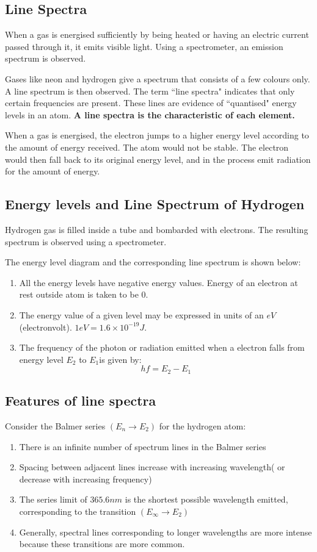 \subsection{Line Spectra}
When a gas is energised sufficiently by being heated or having an electric current passed through it, it emits visible light. Using a spectrometer, an emission spectrum is observed.

Gases like neon and hydrogen give a spectrum that consists of a few colours only. A line spectrum is then observed. The term ``line spectra" indicates that only certain frequencies are present. These lines are evidence of ``quantised" energy levels in an atom.\textbf{ A line spectra is the characteristic of each element.}

When a gas is energised, the electron jumps to a higher energy level according to the amount of energy received. The atom would not be stable. The electron would then fall back to its original energy level, and in the process emit radiation for the amount of energy.

\subsection{Energy levels and Line Spectrum of Hydrogen}
Hydrogen gas is filled inside a tube and bombarded with electrons. The resulting spectrum is observed using a spectrometer.

The energy level diagram and the corresponding line spectrum is shown below:

\begin{enumerate}
\item All the energy levels have negative energy values. Energy of an electron at rest outside atom is taken to be 0.
\item The energy value of a given level may be expressed in units of an $eV$ (electronvolt). $1 eV = 1.6 \times 10^{-19}J$.
\item The frequency of the photon or radiation emitted when a electron falls from energy level $E_2$ to $E_1$is given by:
$$hf=E_2- E_1$$ 
\end{enumerate}

\subsection{Features of line spectra}
Consider the Balmer series $(E_n \rightarrow E_2)$ for the hydrogen atom:
\begin{enumerate}
\item There is an infinite number of spectrum lines in the Balmer series
\item Spacing between adjacent lines increase with increasing wavelength( or decrease with increasing frequency)
\item The series limit of $365.6 nm$ is the shortest possible wavelength emitted, corresponding to the transition $(E_{\infty} \rightarrow E_2)$
\item Generally, spectral lines corresponding to longer wavelengths are more intense because these transitions are more common.
\end{enumerate}
